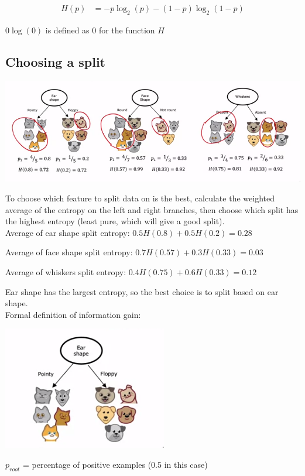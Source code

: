 \documentclass[12pt]{article}
\begin{document}
\begin{align*}
    H(p) &= -p \log_2(p) - (1 - p) \log_2(1 - p)
\end{align*}

$0 \log(0)$ is defined as 0 for the function $H$

\subsection{Choosing a split}

\includegraphics[scale=.6]{split}

To choose which feature to split data on is the best, calculate the weighted average of the entropy on the left
and right branches, then choose which split has the highest entropy (least pure, which will give a good split).\\

Average of ear shape split entropy: $0.5 H(0.8) + 0.5 H(0.2) = 0.28$

Average of face shape split entropy: $0.7 H(0.57) + 0.3 H(0.33) = 0.03$

Average of whiskers split entropy: $0.4 H(0.75) + 0.6 H(0.33) = 0.12$

Ear shape has the largest entropy, so the best choice is to split based on ear shape.\\

Formal definition of information gain:

\includegraphics{information-gain}

$p_{root}$ = percentage of positive examples (0.5 in this case)
\end{document}
